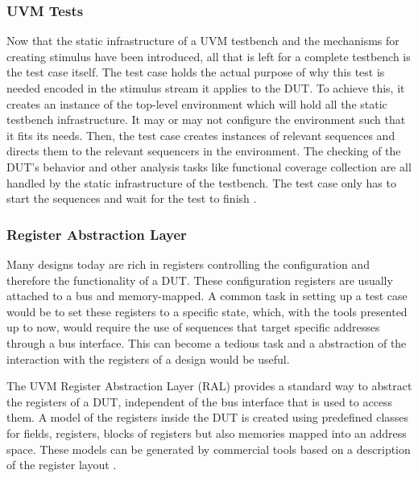 \subsubsection{UVM Tests} %

Now that the static infrastructure of a UVM testbench and the mechanisms for creating stimulus have been introduced,
all that is left for a complete testbench is the test case itself. The test case holds the actual purpose of why this
test is needed encoded in the stimulus stream it applies to the DUT. To achieve this, it creates an instance of the
top-level environment which will hold all the static testbench infrastructure. It may or may not configure the
environment such that it fits its needs. Then, the test case creates instances of relevant sequences and directs them
to the relevant sequencers in the environment. The checking of the DUT's behavior and other analysis tasks like
functional coverage collection are all handled by the static infrastructure of the testbench. The test case only has
to start the sequences and wait for the test to finish \cite[Ch. 4.3]{mehta2018asic}.

\subsubsection{Register Abstraction Layer} %

Many designs today are rich in registers controlling the configuration and therefore the functionality of a DUT.
These configuration registers are usually attached to a bus and memory-mapped. A common task in setting up a test
case would be to set these registers to a specific state, which, with the tools presented up to now, would require
the use of sequences that target specific addresses through a bus interface. This can become a tedious task and a
abstraction of the interaction with the registers of a design would be useful.

The UVM Register Abstraction Layer (RAL) provides a standard way to abstract the registers of a DUT, independent of
the bus interface that is used to access them. A model of the registers inside the DUT is created using predefined
classes for fields, registers, blocks of registers but also memories mapped into an address space. These models can
be generated by commercial tools based on a description of the register layout \cite{uvm_ral}.

